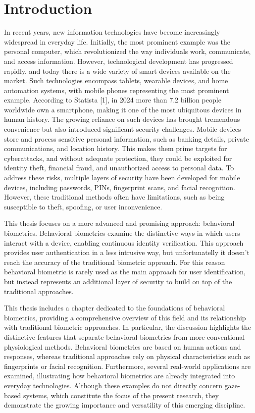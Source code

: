 \documentclass[12pt]{report}
\begin{document}
\chapter{Introduction}

\setlength{\parindent}{0pt}
\setlength{\parskip}{0.7\baselineskip}
In recent years, new information technologies have become increasingly widespread in everyday life. 
Initially, the most prominent example was the personal computer, which revolutionized the way individuals work, communicate, and access information.
However, technological development has progressed rapidly, and today there is a wide variety of smart devices available on the market.
Such technologies encompass tablets, wearable devices, and home automation systems, with mobile phones representing the most prominent example.
According to Statista [1], in 2024 more than 7.2 billion people worldwide own a smartphone, making it one of the most ubiquitous devices in human history.
The growing reliance on such devices has brought tremendous convenience but also introduced significant security challenges. 
Mobile devices store and process sensitive personal information, such as banking details, private communications, and location history. 
This makes them prime targets for cyberattacks, and without adequate protection, they could be exploited for identity theft, financial fraud, and unauthorized access to personal data.
To address these risks, multiple layers of security have been developed for mobile devices, including passwords, PINs, fingerprint scans, and facial recognition.
However, these traditional methods often have limitations, such as being susceptible to theft, spoofing, or user inconvenience. 

This thesis focuses on a more advanced and promising approach: behavioral biometrics.
Behavioral biometrics examine the distinctive ways in which users interact with a device, enabling continuous identity verification.
This approach provides user authentication in a less intrusive way, but unfortunatelly it doesn't reach the accuracy of the traditional biometric approach.
For this reason behavioral biometric is rarely used as the main approach for user identification, but instead represents an additional layer of security to build on top of the traditional approaches.

This thesis includes a chapter dedicated to the foundations of behavioral biometrics, providing a comprehensive overview of this field and its relationship with traditional biometric approaches.
In particular, the discussion highlights the distinctive features that separate behavioral biometrics from more conventional physiological methods.
Behavioral biometrics are based on human actions and responses, whereas traditional approaches rely on physical characteristics such as fingerprints or facial recognition.
Furthermore, several real-world applications are examined, illustrating how behavioral biometrics are already integrated into everyday technologies. 
Although these examples do not directly concern gaze-based systems, which constitute the focus of the present research, they demonstrate the growing importance and versatility of this emerging discipline.
\end{document}
